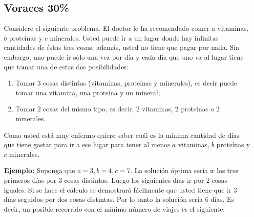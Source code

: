 \documentclass[10 pt]{article}
\begin{document}
\begin{multicols}{2}
\section{Voraces 30\%}
Considere el siguiente problema. El doctor le ha recomendado comer $a$ vitaminas, $b$ proteínas y $c$ minerales. Usted puede ir a un lugar donde hay infinitas cantidades de éstas tres cosas; además, usted no tiene que pagar por nada. Sin embargo, uno puede ir sólo una vez por día y cada día que uno va al lugar tiene que tomar una de estas dos posibilidades:
\begin{enumerate}
\item Tomar $3$ cosas distintas (vitaminas, proteínas y minerales), es decir puede tomar una vitamina, una proteína y un mineral;
\item Tomar $2$ cosas del mismo tipo, es decir, $2$ vitaminas, $2$ proteínas o $2$ minerales.
\end{enumerate}

Como usted está muy enfermo quiere saber cuál es la mínima cantidad de días que tiene gastar para ir a ese lugar para tener al menos $a$ vitaminas, $b$ proteínas y $c$ minerales. 

\textbf{Ejemplo: } Suponga que $a = 3, b = 4, c = 7$. La solución óptima sería ir los tres primeros días por $3$ cosas distintas. Luego los siguientes días ir por $2$ cosas iguales. Si se hace el cálculo se demostrará fácilmente que usted tiene que ir $3$ días seguidos por dos cosas distintas. Por lo tanto la solución sería $6$ días. Es decir, un posible recorrido con el mínimo número de viajes es el siguiente:


\end{multicols}
\end{document}
